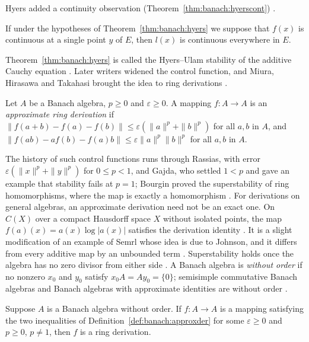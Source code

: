 Hyers added a continuity observation (Theorem~\ref{thm:banach:hyerscont})
\cite[Theorem~2, p.~224]{Hyers1941Stability}.\begin{theorem}\label{thm:banach:hyerscont}
If under the hypotheses of Theorem~\ref{thm:banach:hyers} we suppose that
$f(x)$ is continuous at a single point $y$ of $E$, then $l(x)$ is
continuous everywhere in $E$.
\end{theorem}

Theorem~\ref{thm:banach:hyers} is called the Hyers--Ulam stability of the
additive Cauchy equation \cite[p.~524]{MiuraHirasawaTakahasi2006}. Later
writers widened the control function, and Miura, Hirasawa and Takahasi
brought the idea to ring derivations
\cite[p.~524]{MiuraHirasawaTakahasi2006}.

\begin{definition}\label{def:banach:approxder}
Let $A$ be a Banach algebra, $p\ge 0$ and $\varepsilon\ge 0$. A mapping
$f:A\to A$ is an \emph{approximate ring derivation} if
$\|f(a+b)-f(a)-f(b)\|\le\varepsilon(\|a\|^p+\|b\|^p)$ for all $a,b$ in
$A$, and $\|f(ab)-af(b)-f(a)b\|\le\varepsilon\|a\|^p\|b\|^p$ for all
$a,b$ in $A$.
\end{definition}

The history of such control functions runs through Rassias, with error
$\varepsilon(\|x\|^p+\|y\|^p)$ for $0\le p<1$, and Gajda, who settled
$1<p$ and gave an example that stability fails at $p=1$; Bourgin proved
the superstability of ring homomorphisms, where the map is exactly a
homomorphism \cite[pp.~524--526]{MiuraHirasawaTakahasi2006}. For
derivations on general algebras, an approximate derivation need not be an
exact one. On $C(X)$ over a compact Hausdorff space $X$ without isolated
points, the map $f(a)(x)=a(x)\log|a(x)|$ satisfies the derivation identity
\cite[pp.~523--524]{MiuraHirasawaTakahasi2006}. It is a slight
modification of an example of Semrl whose idea is due to
Johnson, and it differs from every additive map by an unbounded term
\cite[pp.~523--524]{MiuraHirasawaTakahasi2006}. Superstability holds once
the algebra has no zero divisor from either side
\cite[Theorem~1, p.~525]{MiuraHirasawaTakahasi2006}. A Banach algebra is
\emph{without order} if no nonzero $x_0$ and $y_0$ satisfy
$x_0A=Ay_0=\{0\}$; semisimple commutative Banach algebras and Banach
algebras with approximate identities are without order
\cite[p.~526]{MiuraHirasawaTakahasi2006}.

\begin{theorem}\label{thm:banach:superstable}
Suppose $A$ is a Banach algebra without order. If $f:A\to A$ is a mapping
satisfying the two inequalities of
Definition~\ref{def:banach:approxder} for some $\varepsilon\ge 0$ and
$p\ge 0$, $p\ne 1$, then $f$ is a ring derivation.
\end{theorem}

